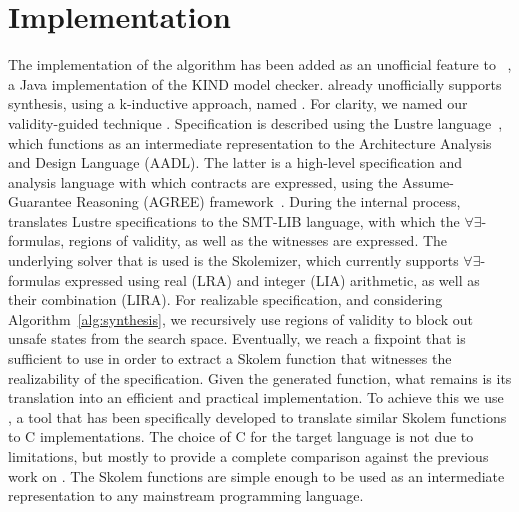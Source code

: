 \section{Implementation}
\label{sec:impl}

The implementation of the algorithm has been added as an
unofficial feature to \jkind~\cite{jkind}, a Java implementation of the
\textsc{KIND} model checker. \jkind already unofficially supports synthesis,
using a k-inductive approach, named \jsyn. For clarity, we named
our validity-guided technique \jsynvg. Specification is described using the
Lustre language~\cite{lustrev6}, which functions as an intermediate representation to the Architecture Analysis and Design Language (\textsc{AADL}).
The latter is a high-level specification and analysis language with which
contracts are expressed, using the Assume-Guarantee Reasoning (\textsc{AGREE})
framework~\cite{NFM2012:CoGaMiWhLaLu}.
During the internal process, \jsynvg translates Lustre specifications to
the SMT-LIB language, with which the $\forall\exists$-formulas, regions of
validity, as well as the witnesses are expressed. The underlying solver that is
used is the \aeval Skolemizer, which currently supports $\forall\exists$-formulas expressed using real (LRA) and integer (LIA) arithmetic, as well as
their combination (LIRA).
%
For realizable specification, and considering Algorithm~\ref{alg:synthesis}, we
recursively use regions of validity to block out unsafe states from the search
space.
Eventually, we reach a fixpoint that is sufficient to use in order to extract
a Skolem function that witnesses the realizability of the specification. Given
the generated function, what remains is its translation
into an efficient and practical implementation. To achieve this we use
\smtlibtoc, a tool that has been specifically developed to translate
similar \aeval Skolem functions to C implementations. The choice of C for
the target language is not due to limitations, but mostly to provide a complete
comparison against the previous work on \jsyn.
The Skolem functions are simple enough to be used as an intermediate
representation to any mainstream programming language.




